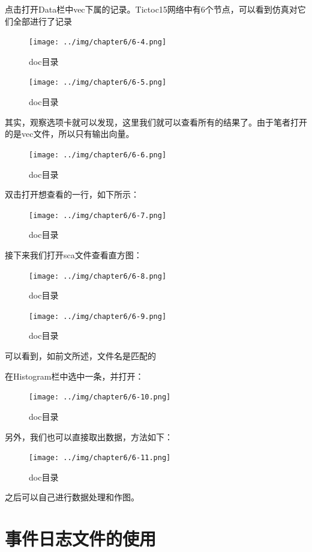 点击打开Data栏中vec下属的记录。Tictoc15网络中有6个节点，可以看到仿真对它们全部进行了记录

\begin{figure}[htbp]
\centering
\texttt{[image: ../img/chapter6/6-4.png]}
\caption{doc目录}
\end{figure}

\begin{figure}[htbp]
\centering
\texttt{[image: ../img/chapter6/6-5.png]}
\caption{doc目录}
\end{figure}

其实，观察选项卡就可以发现，这里我们就可以查看所有的结果了。由于笔者打开的是vec文件，所以只有输出向量。

\begin{figure}[htbp]
\centering
\texttt{[image: ../img/chapter6/6-6.png]}
\caption{doc目录}
\end{figure}

双击打开想查看的一行，如下所示：

\begin{figure}[htbp]
\centering
\texttt{[image: ../img/chapter6/6-7.png]}
\caption{doc目录}
\end{figure}

接下来我们打开sca文件查看直方图：

\begin{figure}[htbp]
\centering
\texttt{[image: ../img/chapter6/6-8.png]}
\caption{doc目录}
\end{figure}

\begin{figure}[htbp]
\centering
\texttt{[image: ../img/chapter6/6-9.png]}
\caption{doc目录}
\end{figure}

可以看到，如前文所述，文件名是匹配的

在Histogram栏中选中一条，并打开：

\begin{figure}[htbp]
\centering
\texttt{[image: ../img/chapter6/6-10.png]}
\caption{doc目录}
\end{figure}

另外，我们也可以直接取出数据，方法如下：

\begin{figure}[htbp]
\centering
\texttt{[image: ../img/chapter6/6-11.png]}
\caption{doc目录}
\end{figure}

之后可以自己进行数据处理和作图。

\section{事件日志文件的使用}
\label{事件日志文件的使用}


